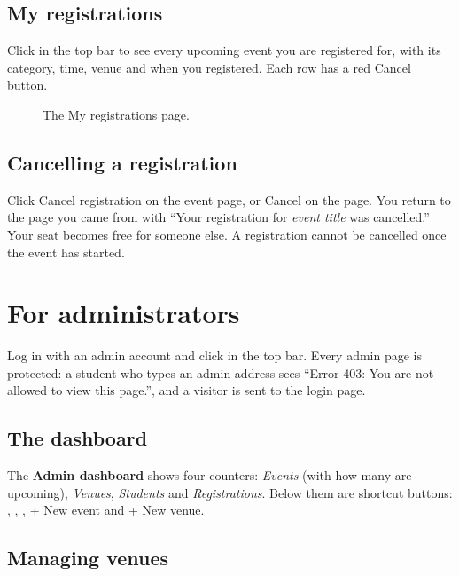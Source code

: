\documentclass[11pt,a4paper]{article}
\begin{document}
\subsection{My registrations}

Click  in the top bar to see every upcoming event you are registered for,
with its category, time, venue and when you registered. Each row has a red \textsf{Cancel} button.

\begin{figure}[H]
\centering
{}
\caption{The My registrations page.}
\end{figure}

\subsection{Cancelling a registration}

Click \textsf{Cancel registration} on the event page, or \textsf{Cancel} on the
 page. You return to the page you came from with
``Your registration for \emph{event title} was cancelled.'' Your seat becomes free for someone else.
A registration cannot be cancelled once the event has started.

\section{For administrators}
\label{sec:admin}

Log in with an admin account and click  in the top bar. Every admin page is protected:
a student who types an admin address sees ``Error 403: You are not allowed to view this page.'', and
a visitor is sent to the login page.

\subsection{The dashboard}

The \textbf{Admin dashboard} shows four counters: \emph{Events} (with how many are upcoming),
\emph{Venues}, \emph{Students} and \emph{Registrations}. Below them are shortcut buttons:
, , , \textsf{+ New event} and
\textsf{+ New venue}.

\subsection{Managing venues}
\end{document}
